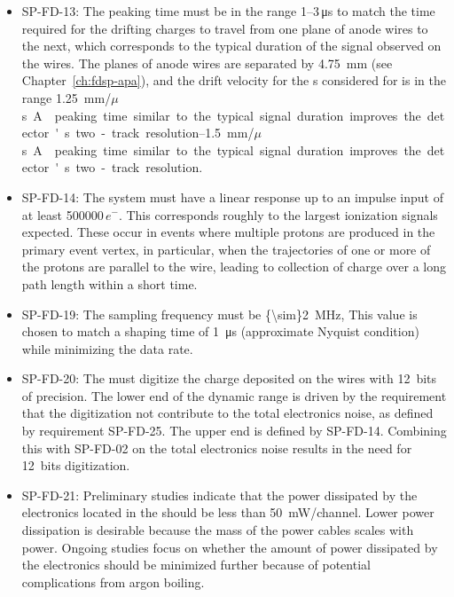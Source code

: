 \begin{itemize}
\item SP-FD-13: The  peaking time must be in the range \numrange{1}{3}\,\si{\micro\second} 
to match the time required for the drifting charges to travel from one plane of anode
wires to the next, which corresponds to the typical duration of the signal observed
on the wires. The planes of anode wires are separated by \SI{4.75}{mm} 
(see Chapter~\ref{ch:fdsp-apa}), and the drift velocity for the \efield{}s 
considered for  is in the range \SIrange{1.25}{1.5}{mm/$\mu$s}. 
A  peaking time  similar to the typical signal duration improves the 
detector's two-track resolution.  

\item SP-FD-14: The system must have a linear response up to an impulse input of 
at least \num{500000}\,$e^{-}$.  This corresponds roughly to the largest 
ionization signals expected. These occur in events where multiple protons are produced 
in the primary event vertex, in particular, when the trajectories of one 
or more of the protons are parallel to the wire, 
leading to collection of charge over a long path length within a short time.

\item SP-FD-19:  The  sampling frequency must be \SI{{\sim}2}{MHz},
This value is chosen to match a  shaping time of \SI{1}{\micro\second} 
(approximate Nyquist condition) while minimizing the data rate.

\item SP-FD-20: The  must digitize the charge deposited on the wires 
with 12~bits of precision.  The lower end of the  dynamic 
range is driven by the requirement that the digitization not contribute 
to the total electronics noise, as defined by requirement SP-FD-25. The upper end
is defined by SP-FD-14. Combining this with SP-FD-02 on the total electronics noise 
results in the need for 12~bits digitization. 

\item SP-FD-21: Preliminary studies indicate that the power dissipated by the 
electronics located in the  should be less than \SI{50}{mW/channel}. 
Lower power dissipation is desirable because the mass of the power cables scales 
with power. Ongoing studies focus on whether the amount of power dissipated by 
the electronics should be minimized further because of potential complications from 
argon boiling. 


\end{itemize}
